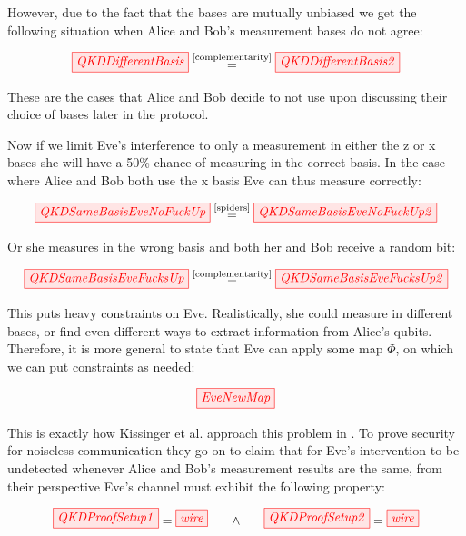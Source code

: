 \documentclass[]{article}
\newcommand{\equaltext}[1]{\ensuremath{\stackrel{\text{#1}}{=}}}
\begin{document}
However, due to the fact that the bases are mutually unbiased we get the following situation when Alice and Bob's measurement bases do not agree:

\begin{equation}
\tikzfig{QKDDifferentBasis} \equaltext{\ref{complementarity}} \tikzfig{QKDDifferentBasis2}
\end{equation}

These are the cases that Alice and Bob decide to not use upon discussing their choice of bases later in the protocol.

Now if we limit Eve's interference to only a measurement in either the z or x bases she will have a 50\% chance of measuring in the correct basis. In the case where Alice and Bob both use the x basis Eve can thus measure correctly:

\begin{equation}
	\tikzfig{QKDSameBasisEveNoFuckUp} \equaltext{\ref{spiders}} \tikzfig{QKDSameBasisEveNoFuckUp2} 
\end{equation}

Or she measures in the wrong basis and both her and Bob receive a random bit:

\begin{equation}
	\tikzfig{QKDSameBasisEveFucksUp} \equaltext{\ref{complementarity}} \tikzfig{QKDSameBasisEveFucksUp2}
\end{equation}

This puts heavy constraints on Eve. Realistically, she could measure in different bases, or find even different ways to extract information from Alice's qubits. Therefore, it is more general to state that Eve can apply some map $\Phi$, on which we can put constraints as needed:

\begin{equation}
	\label{equation:EveNewMap}
	\tikzfig{EveNewMap}
\end{equation}

This is exactly how Kissinger et al. approach this problem in \cite{Kissinger2017}. To prove security for noiseless communication they go on to claim that for Eve's intervention to be undetected whenever Alice and Bob's measurement results are the same, from their perspective Eve's channel must exhibit the following property:

\begin{equation}
	\label{QKDProofSetup}
	\tikzfig{QKDProofSetup1} = \tikzfig{wire} ~~~~~ \land ~~~~~ \tikzfig{QKDProofSetup2} = \tikzfig{wire}
\end{equation}
\end{document}
